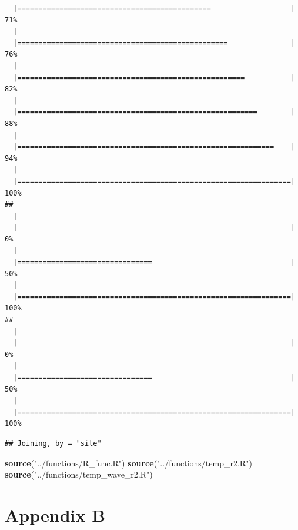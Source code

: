 \documentclass[10pt,A4,]{article}
\newenvironment{Shaded}{\begin{snugshade}}{\end{snugshade}}
\newcommand{\KeywordTok}[1]{\textcolor[rgb]{0.13,0.29,0.53}{\textbf{#1}}}
\newcommand{\StringTok}[1]{\textcolor[rgb]{0.31,0.60,0.02}{#1}}
\newcommand{\NormalTok}[1]{#1}
\begin{document}
\begin{verbatim}
  |==============================================                   |  71%
  |                                                                       
  |==================================================               |  76%
  |                                                                       
  |======================================================           |  82%
  |                                                                       
  |=========================================================        |  88%
  |                                                                       
  |=============================================================    |  94%
  |                                                                       
  |=================================================================| 100%
## 
  |                                                                       
  |                                                                 |   0%
  |                                                                       
  |================================                                 |  50%
  |                                                                       
  |=================================================================| 100%
## 
  |                                                                       
  |                                                                 |   0%
  |                                                                       
  |================================                                 |  50%
  |                                                                       
  |=================================================================| 100%
\end{verbatim}

\begin{verbatim}
## Joining, by = "site"
\end{verbatim}

\begin{Shaded}
\begin{Highlighting}[]
\KeywordTok{source}\NormalTok{(}\StringTok{"../functions/R_func.R"}\NormalTok{)}
\KeywordTok{source}\NormalTok{(}\StringTok{"../functions/temp_r2.R"}\NormalTok{)}
\KeywordTok{source}\NormalTok{(}\StringTok{"../functions/temp_wave_r2.R"}\NormalTok{)}
\end{Highlighting}
\end{Shaded}

\newpage

\section*{\large{Appendix B}}
\end{document}
